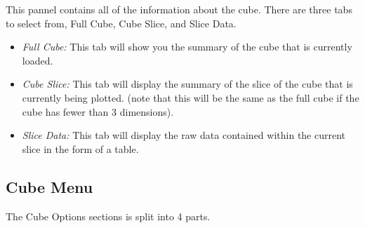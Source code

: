 \documentclass[a4paper,12pt]{article}
\begin{document}
This pannel contains all of the information about the cube. There are three tabs
to select from, Full Cube, Cube Slice, and Slice Data.

\begin{itemize}

\item
\emph{Full Cube:} This tab will show you the summary of the cube that is
currently loaded.

\item
\emph{Cube Slice:} This tab will display the summary of the slice of the cube
that is currently being plotted. (note that this will be the same as the full
cube if the cube has fewer than 3 dimensions).

\item
\emph{Slice Data:} This tab will display the raw data contained within the
current slice in the form of a table.

\end{itemize}

\subsection{Cube Menu}

The Cube Options sections is split into 4 parts.
\end{document}
